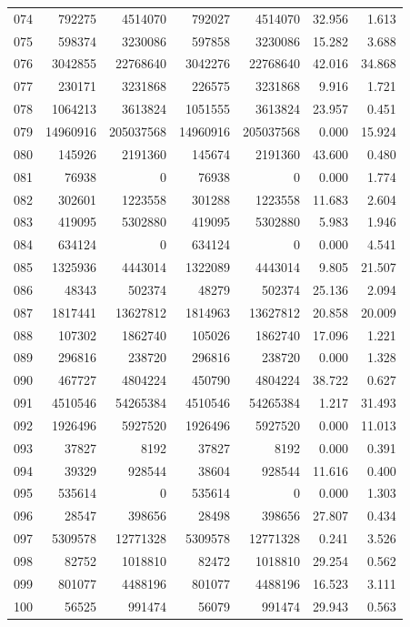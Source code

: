 \begin{longtable}{lrrrrrr}
074 & 792275 & 4514070 & 792027 & 4514070 & 32.956 & 1.613\\
075 & 598374 & 3230086 & 597858 & 3230086 & 15.282 & 3.688\\
076 & 3042855 & 22768640 & 3042276 & 22768640 & 42.016 & 34.868\\
077 & 230171 & 3231868 & 226575 & 3231868 & 9.916 & 1.721\\
078 & 1064213 & 3613824 & 1051555 & 3613824 & 23.957 & 0.451\\
079 & 14960916 & 205037568 & 14960916 & 205037568 & 0.000 & 15.924\\
080 & 145926 & 2191360 & 145674 & 2191360 & 43.600 & 0.480\\
081 & 76938 & 0 & 76938 & 0 & 0.000 & 1.774\\
082 & 302601 & 1223558 & 301288 & 1223558 & 11.683 & 2.604\\
083 & 419095 & 5302880 & 419095 & 5302880 & 5.983 & 1.946\\
084 & 634124 & 0 & 634124 & 0 & 0.000 & 4.541\\
085 & 1325936 & 4443014 & 1322089 & 4443014 & 9.805 & 21.507\\
086 & 48343 & 502374 & 48279 & 502374 & 25.136 & 2.094\\
087 & 1817441 & 13627812 & 1814963 & 13627812 & 20.858 & 20.009\\
088 & 107302 & 1862740 & 105026 & 1862740 & 17.096 & 1.221\\
089 & 296816 & 238720 & 296816 & 238720 & 0.000 & 1.328\\
090 & 467727 & 4804224 & 450790 & 4804224 & 38.722 & 0.627\\
091 & 4510546 & 54265384 & 4510546 & 54265384 & 1.217 & 31.493\\
092 & 1926496 & 5927520 & 1926496 & 5927520 & 0.000 & 11.013\\
093 & 37827 & 8192 & 37827 & 8192 & 0.000 & 0.391\\
094 & 39329 & 928544 & 38604 & 928544 & 11.616 & 0.400\\
095 & 535614 & 0 & 535614 & 0 & 0.000 & 1.303\\
096 & 28547 & 398656 & 28498 & 398656 & 27.807 & 0.434\\
097 & 5309578 & 12771328 & 5309578 & 12771328 & 0.241 & 3.526\\
098 & 82752 & 1018810 & 82472 & 1018810 & 29.254 & 0.562\\
099 & 801077 & 4488196 & 801077 & 4488196 & 16.523 & 3.111\\
100 & 56525 & 991474 & 56079 & 991474 & 29.943 & 0.563\\
\end{longtable}

